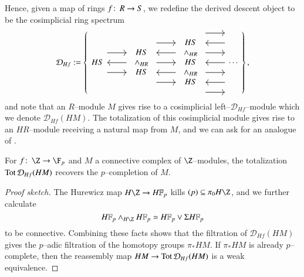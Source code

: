Hence, given a map of rings $f\colon\thinspace R \to S$, we redefine the derived descent object to be the cosimplicial ring spectrum
\[\mathcal D_{Hf} := \left\{
\begin{tikzcd}[ampersand replacement=\&]
HS \arrow[leftarrow]{r} \arrow[shift left=\baselineskip]{r} \arrow[shift right=\baselineskip]{r} \&
\begin{array}{c} HS \\ \sm_{HR} \\ HS \end{array} \arrow[shift left=(2*\baselineskip)]{r} \arrow[leftarrow, shift left=\baselineskip]{r} \arrow{r} \arrow[leftarrow, shift right=\baselineskip]{r} \arrow[shift right=(2*\baselineskip)]{r} \&
\begin{array}{c} HS \\ \sm_{HR} \\ HS \\ \sm_{HR} \\ HS \end{array} \arrow[shift left=(3*\baselineskip)]{r} \arrow[leftarrow, shift left=(2*\baselineskip)]{r} \arrow[shift left=\baselineskip]{r} \arrow[leftarrow]{r} \arrow[shift right=\baselineskip]{r} \arrow[leftarrow, shift right=(2*\baselineskip)]{r} \arrow[shift right=(3*\baselineskip)]{r} \&
\cdots
\end{tikzcd}
\right\},\]
and note that an $R$--module $M$ gives rise to a cosimplicial left--$\mathcal D_{Hf}$--module which we denote $\mathcal D_{Hf}(HM)$.  The totalization of this cosimplicial module gives rise to an $HR$--module receiving a natural map from $M$, and we can ask for an analogue of .

\begin{lemma}\label{DescentFromHFpToHZp}
For $f\co \Z \to \F_p$ and $M$ a connective complex of $\Z$--modules, the totalization $\operatorname{Tot} \mathcal D_{Hf}(HM)$ recovers the $p$--completion of $M$.
\end{lemma}
\begin{proof}[Proof sketch]
The Hurewicz map $H\Z \to \HFp$ kills $(p) \subseteq \pi_0 H\Z$, and we further calculate \[\HFp \sm_{H\Z} \HFp \simeq \HFp \vee \Susp \HFp\] to be connective.  Combining these facts shows that the filtration of $\mathcal D_{Hf}(HM)$ gives the $p$--adic filtration of the homotopy groups $\pi_* HM$.  If $\pi_* HM$ is already $p$--complete, then the reassembly map $HM \to \operatorname{Tot} \mathcal D_{Hf}(HM)$ is a weak equivalence.
\end{proof}

